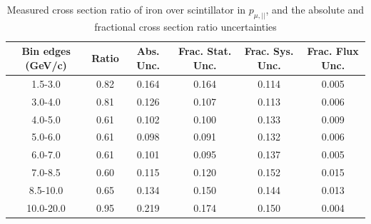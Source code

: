 \documentclass[../main.tex]{subfiles}
\begin{document}
\begin{table}
  \centering
  \renewcommand{\arraystretch}{1.15}
  \caption{Measured cross section ratio of iron over scintillator in $p_{\mu,||}$, and the absolute and fractional cross section ratio uncertainties}
    \begin{tabular}{c||c|c||c|c|c}
      Bin edges (GeV/c) &  Ratio  &  Abs. Unc.  &  Frac. Stat. Unc.  &  Frac. Sys. Unc.  &  Frac. Flux Unc. \\
      \hline
      \hline
      1.5-3.0 & 0.82 & 0.164 & 0.164 & 0.114 & 0.005\\
      3.0-4.0 & 0.81 & 0.126 & 0.107 & 0.113 & 0.006\\
      4.0-5.0 & 0.61 & 0.102 & 0.100 & 0.133 & 0.009\\
      5.0-6.0 & 0.61 & 0.098 & 0.091 & 0.132 & 0.006\\
      6.0-7.0 & 0.61 & 0.101 & 0.095 & 0.137 & 0.005\\
      7.0-8.5 & 0.60 & 0.115 & 0.120 & 0.152 & 0.015\\
      8.5-10.0 & 0.65 & 0.134 & 0.150 & 0.144 & 0.013\\
      10.0-20.0 & 0.95 & 0.219 & 0.174 & 0.150 & 0.004
    \end{tabular}
  \label{tbl:rationucleonnuc26muon_pza}
\end{table}
\begin{table}
  \centering
  \renewcommand{\arraystretch}{1.15}
  \caption{Statistical covariance matrix of measured cross section ratio of iron over scintillator in $p_{\mu,||}$}
  \label{tbl:rationucleonnuc26muon_pzb}
\end{table}
\end{document}

